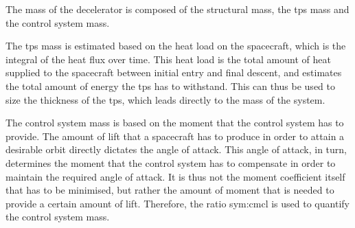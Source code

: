 The mass of the decelerator is composed of the structural mass, the \gls{tps} mass and the control system mass.

The \gls{tps} mass is estimated based on the heat load on the spacecraft, which is the integral of the heat flux over time. This heat load is the total amount of heat supplied to the spacecraft between initial entry and final descent, and estimates the total amount of energy the \gls{tps} has to withstand. This can thus be used to size the thickness of the \gls{tps}, which leads directly to the mass of the system.

The control system mass is based on the moment that the control system has to provide. The amount of lift that a spacecraft has to produce in order to attain a desirable orbit directly dictates the angle of attack. This angle of attack, in turn, determines the moment that the control system has to compensate in order to maintain the required angle of attack. It is thus not the moment coefficient itself that has to be minimised, but rather the amount of moment that is needed to provide a certain amount of lift. Therefore, the ratio \gls{sym:cmcl} is used to quantify the control system mass. \\


